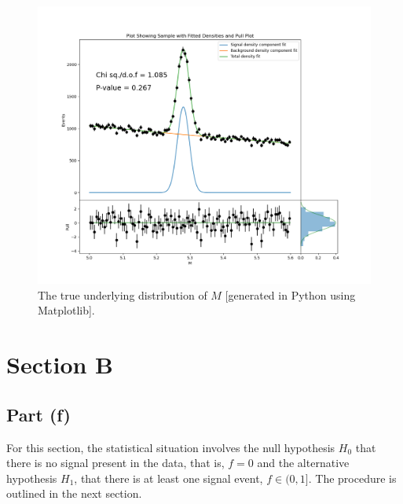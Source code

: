 \documentclass[12pt]{article}
\begin{document}
\begin{figure}[hbt]
    \includegraphics[scale=0.4]{part_e_plot.png}
    \caption{The true underlying distribution of $M$ [generated in Python using Matplotlib].}
    \label{part_e_plot}
\end{figure}

\section*{Section B}

\subsection*{Part (f)}

For this section, the statistical situation involves the null hypothesis $H_0$ that there is no signal present in the data, that is, $f=0$ and the alternative hypothesis $H_1$, that there is at least one signal event, $f\in(0,1]$.
The procedure is outlined in the next section.
\end{document}
